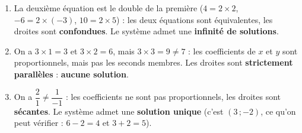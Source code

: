 \documentclass[11pt]{article}
\begin{document}
\begin{corrige}
\begin{enumerate}
\item La deuxième équation est le double de la première ($4=2\times 2$, $-6=2\times(-3)$, $10=2\times 5$) : les deux équations sont équivalentes, les droites sont \textbf{confondues}. Le système admet une \textbf{infinité de solutions}.
\item On a $3\times 1=3$ et $3\times 2=6$, mais $3\times 3=9\neq 7$ : les coefficients de $x$ et $y$ sont proportionnels, mais pas les seconds membres. Les droites sont \textbf{strictement parallèles} : \textbf{aucune solution}.
\item On a $\dfrac{2}{1}\neq \dfrac{1}{-1}$ : les coefficients ne sont pas proportionnels, les droites sont \textbf{sécantes}. Le système admet une \textbf{solution unique} (c'est $(3\,;-2)$, ce qu'on peut vérifier : $6-2=4$ et $3+2=5$).
\end{enumerate}
\end{corrige}
\end{document}

